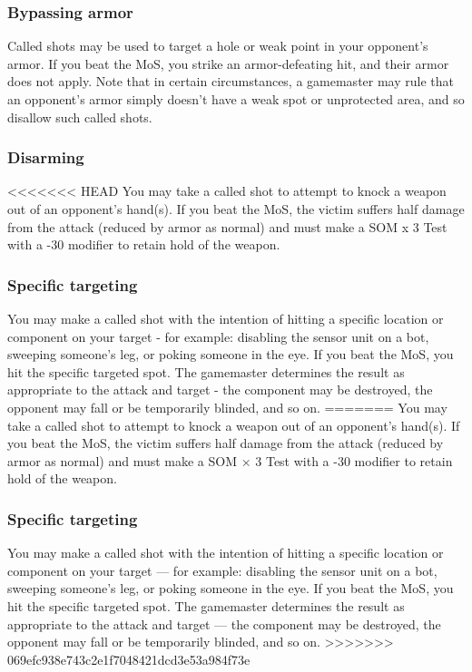 \subsubsection{Bypassing armor} 

Called shots may be used to target a hole or weak point in your opponent’s armor. If you beat the MoS, you strike an armor-defeating hit, and their armor does not apply. Note that in certain circumstances, a gamemaster may rule that an opponent’s armor simply doesn’t have a weak spot or unprotected area, and so disallow such called shots. 

\subsubsection{Disarming} 

<<<<<<< HEAD You may take a called shot to attempt to knock a weapon out of an opponent’s hand(s). If you beat the MoS, the victim suffers half damage from the attack (reduced by armor as normal) and must make a SOM x 3 Test with a -30 modifier to retain hold of the weapon. 

\subsubsection{Specific targeting} 

You may make a called shot with the intention of hitting a specific location or component on your target - for example: disabling the sensor unit on a bot, sweeping someone’s leg, or poking someone in the eye. If you beat the MoS, you hit the specific targeted spot. The gamemaster determines the result as appropriate to the attack and target - the component may be destroyed, the opponent may fall or be temporarily blinded, and so on. ======= You may take a called shot to attempt to knock a weapon out of an opponent’s hand(s). If you beat the MoS, the victim suffers half damage from the attack (reduced by armor as normal) and must make a SOM $\times$ 3 Test with a -30 modifier to retain hold of the weapon. 

\subsubsection{Specific targeting} 

You may make a called shot with the intention of hitting a specific location or component on your target --- for example: disabling the sensor unit on a bot, sweeping someone’s leg, or poking someone in the eye. If you beat the MoS, you hit the specific targeted spot. The gamemaster determines the result as appropriate to the attack and target --- the component may be destroyed, the opponent may fall or be temporarily blinded, and so on. >>>>>>> 069efc938e743c2e1f7048421dcd3e53a984f73e 

